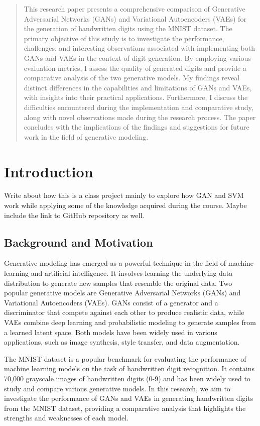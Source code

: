 \documentclass{article}
\begin{document}
\begin{abstract}
This research paper presents a comprehensive comparison of Generative Adversarial Networks (GANs) and Variational Autoencoders (VAEs) for the generation of handwritten digits using the MNIST dataset. The primary objective of this study is to investigate the performance, challenges, and interesting observations associated with implementing both GANs and VAEs in the context of digit generation. By employing various evaluation metrics, I assess the quality of generated digits and provide a comparative analysis of the two generative models. My findings reveal distinct differences in the capabilities and limitations of GANs and VAEs, with insights into their practical applications. Furthermore, I discuss the difficulties encountered during the implementation and comparative study, along with novel observations made during the research process. The paper concludes with the implications of the findings and suggestions for future work in the field of generative modeling.
\end{abstract}

\section{Introduction}
Write about how this is a class project mainly to explore how GAN and SVM work while applying some of the knowledge acquired during the course. Maybe include the link to GitHub repository as well.

\subsection{Background and Motivation}
Generative modeling has emerged as a powerful technique in the field of machine learning and artificial intelligence. It involves learning the underlying data distribution to generate new samples that resemble the original data. Two popular generative models are Generative Adversarial Networks (GANs) and Variational Autoencoders (VAEs). GANs consist of a generator and a discriminator that compete against each other to produce realistic data, while VAEs combine deep learning and probabilistic modeling to generate samples from a learned latent space. Both models have been widely used in various applications, such as image synthesis, style transfer, and data augmentation.

The MNIST dataset is a popular benchmark for evaluating the performance of machine learning models on the task of handwritten digit recognition. It contains 70,000 grayscale images of handwritten digits (0-9) and has been widely used to study and compare various generative models. In this research, we aim to investigate the performance of GANs and VAEs in generating handwritten digits from the MNIST dataset, providing a comparative analysis that highlights the strengths and weaknesses of each model.
\end{document}
